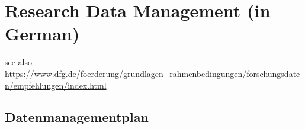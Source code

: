\chapter{Research Data Management (in German)}
\label{chap:appendix}


see also \url{https://www.dfg.de/foerderung/grundlagen_rahmenbedingungen/forschungsdaten/empfehlungen/index.html}

\section*{Datenmanagementplan}

